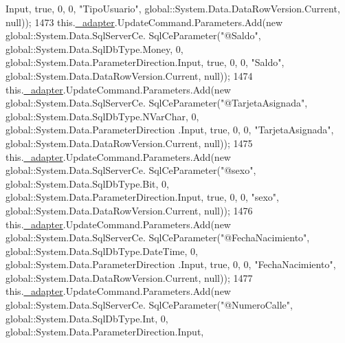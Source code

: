 \begin{DoxyCode}
      Input, \textcolor{keyword}{true}, 0, 0, \textcolor{stringliteral}{"TipoUsuario"}, global::System.Data.DataRowVersion.Current, null));
1473             this.\hyperlink{class_proyecto___integrador__3_1_1ds_usuarios_table_adapters_1_1_usuarios_table_adapter_ab48b9b83ce2db01dbbc83ad45b428a80}{\_adapter}.UpdateCommand.Parameters.Add(\textcolor{keyword}{new} global::System.Data.SqlServerCe.
      SqlCeParameter(\textcolor{stringliteral}{"@Saldo"}, global::System.Data.SqlDbType.Money, 0, global::System.Data.ParameterDirection.Input, \textcolor{keyword}{true},
       0, 0, \textcolor{stringliteral}{"Saldo"}, global::System.Data.DataRowVersion.Current, null));
1474             this.\hyperlink{class_proyecto___integrador__3_1_1ds_usuarios_table_adapters_1_1_usuarios_table_adapter_ab48b9b83ce2db01dbbc83ad45b428a80}{\_adapter}.UpdateCommand.Parameters.Add(\textcolor{keyword}{new} global::System.Data.SqlServerCe.
      SqlCeParameter(\textcolor{stringliteral}{"@TarjetaAsignada"}, global::System.Data.SqlDbType.NVarChar, 0, global::System.Data.ParameterDirection
      .Input, \textcolor{keyword}{true}, 0, 0, \textcolor{stringliteral}{"TarjetaAsignada"}, global::System.Data.DataRowVersion.Current, null));
1475             this.\hyperlink{class_proyecto___integrador__3_1_1ds_usuarios_table_adapters_1_1_usuarios_table_adapter_ab48b9b83ce2db01dbbc83ad45b428a80}{\_adapter}.UpdateCommand.Parameters.Add(\textcolor{keyword}{new} global::System.Data.SqlServerCe.
      SqlCeParameter(\textcolor{stringliteral}{"@sexo"}, global::System.Data.SqlDbType.Bit, 0, global::System.Data.ParameterDirection.Input, \textcolor{keyword}{true}, 0,
       0, \textcolor{stringliteral}{"sexo"}, global::System.Data.DataRowVersion.Current, null));
1476             this.\hyperlink{class_proyecto___integrador__3_1_1ds_usuarios_table_adapters_1_1_usuarios_table_adapter_ab48b9b83ce2db01dbbc83ad45b428a80}{\_adapter}.UpdateCommand.Parameters.Add(\textcolor{keyword}{new} global::System.Data.SqlServerCe.
      SqlCeParameter(\textcolor{stringliteral}{"@FechaNacimiento"}, global::System.Data.SqlDbType.DateTime, 0, global::System.Data.ParameterDirection
      .Input, \textcolor{keyword}{true}, 0, 0, \textcolor{stringliteral}{"FechaNacimiento"}, global::System.Data.DataRowVersion.Current, null));
1477             this.\hyperlink{class_proyecto___integrador__3_1_1ds_usuarios_table_adapters_1_1_usuarios_table_adapter_ab48b9b83ce2db01dbbc83ad45b428a80}{\_adapter}.UpdateCommand.Parameters.Add(\textcolor{keyword}{new} global::System.Data.SqlServerCe.
      SqlCeParameter(\textcolor{stringliteral}{"@NumeroCalle"}, global::System.Data.SqlDbType.Int, 0, global::System.Data.ParameterDirection.Input, \textcolor{keyword}{
}
\end{DoxyCode}
